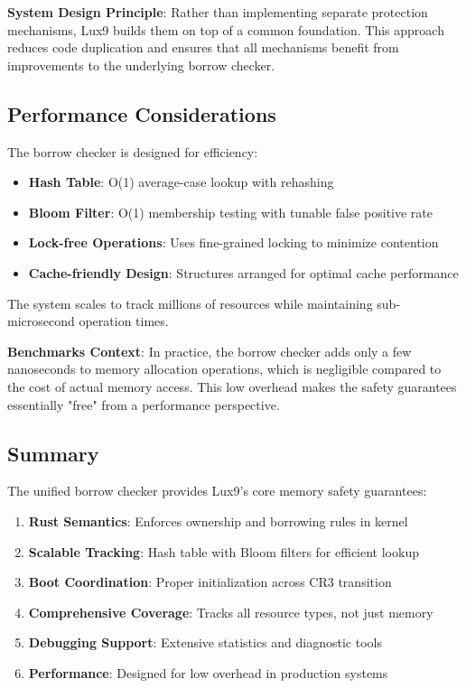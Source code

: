 \documentclass[11pt,letterpaper]{article}
\begin{document}
\textbf{System Design Principle}: Rather than implementing separate protection mechanisms, Lux9 builds them on top of a common foundation. This approach reduces code duplication and ensures that all mechanisms benefit from improvements to the underlying borrow checker.

\subsection{Performance Considerations}

The borrow checker is designed for efficiency:

\begin{itemize}
\item \textbf{Hash Table}: O(1) average-case lookup with rehashing
\item \textbf{Bloom Filter}: O(1) membership testing with tunable false positive rate
\item \textbf{Lock-free Operations}: Uses fine-grained locking to minimize contention
\item \textbf{Cache-friendly Design}: Structures arranged for optimal cache performance
\end{itemize}

The system scales to track millions of resources while maintaining sub-microsecond operation times.

\textbf{Benchmarks Context}: In practice, the borrow checker adds only a few nanoseconds to memory allocation operations, which is negligible compared to the cost of actual memory access. This low overhead makes the safety guarantees essentially "free" from a performance perspective.

\subsection{Summary}

The unified borrow checker provides Lux9's core memory safety guarantees:

\begin{enumerate}
\item \textbf{Rust Semantics}: Enforces ownership and borrowing rules in kernel
\item \textbf{Scalable Tracking}: Hash table with Bloom filters for efficient lookup
\item \textbf{Boot Coordination}: Proper initialization across CR3 transition
\item \textbf{Comprehensive Coverage}: Tracks all resource types, not just memory
\item \textbf{Debugging Support}: Extensive statistics and diagnostic tools
\item \textbf{Performance}: Designed for low overhead in production systems
\end{enumerate}
\end{document}

